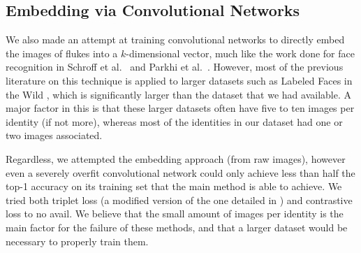 \subsection{Embedding via Convolutional Networks}

We also made an attempt at training convolutional networks to directly embed the images of flukes into a $k$-dimensional vector, much like the work done for face recognition in Schroff et al.\ \cite{schroff2015facenet} and Parkhi et al.\ \cite{parkhi2015deep}.
However, most of the previous literature on this technique is applied to larger datasets such as Labeled Faces in the Wild \cite{huang2007labeled}, which is significantly larger than the dataset that we had available.
A major factor in this is that these larger datasets often have five to ten images per identity (if not more), whereas most of the identities in our dataset had one or two images associated.

Regardless, we attempted the embedding approach (from raw images), however even a severely overfit convolutional network could only achieve less than half the top-1 accuracy on its training set that the main method is able to achieve.
We tried both triplet loss (a modified version of the one detailed in \cite{schroff2015facenet}) and contrastive loss \cite{hadsell2006dimensionality} to no avail.
We believe that the small amount of images per identity is the main factor for the failure of these methods, and that a larger dataset would be necessary to properly train them.


